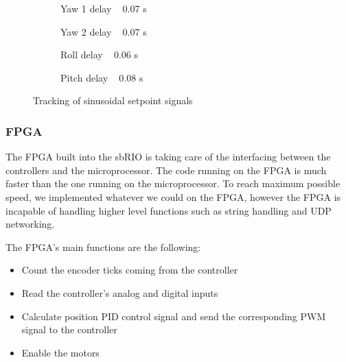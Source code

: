 \begin{figure}
	\begin{subfigure}[b]{0.5\textwidth}
		\centering
		\resizebox{\linewidth}{!}{
			
		}
		\caption{Yaw 1 delay ~ 0.07 s}
	\end{subfigure}
	\begin{subfigure}[b]{0.5\textwidth}
		\centering
		\resizebox{\linewidth}{!}{
			
		}
		\caption{Yaw 2 delay ~ 0.07 s}
	\end{subfigure}
	\begin{subfigure}[b]{0.5\textwidth}
		\centering
		\resizebox{\linewidth}{!}{
			
		}
		\caption{Roll delay ~ 0.06 s}
	\end{subfigure}
	\begin{subfigure}[b]{0.5\textwidth}
		\centering
		\resizebox{\linewidth}{!}{
			
		}
		\caption{Pitch delay ~ 0.08 s}
	\end{subfigure}
	\caption{Tracking of sinusoidal setpoint signals}
	\label{sin_excite}
\end{figure}



\subsubsection{FPGA}

The FPGA built into the sbRIO is taking care of the interfacing between the controllers and the microprocessor. The code running on the FPGA is much faster than the one running on the microprocessor. To reach maximum possible speed, we implemented whatever we could on the FPGA, however the FPGA is incapable of handling higher level functions such as string handling and UDP networking.

The FPGA's main functions are the following:

\begin{itemize}	
	\setlength\itemsep{0em}
	\item Count the encoder ticks coming from the controller
	\item Read the controller's analog and digital inputs 
	\item Calculate position PID control signal and send the corresponding PWM signal to the controller
	\item Enable the motors
	
\end{itemize}

